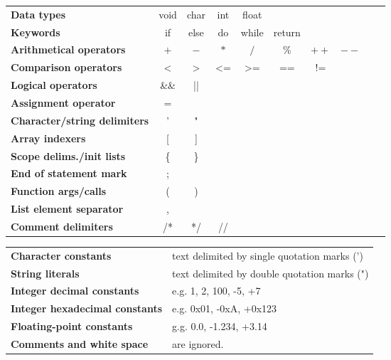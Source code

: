 \documentclass[12pt]{article}
\begin{document}
\begin{tabular}{lccccccccc}
\textbf{Data types}                      & void & char & int & float &         &      &      &   &   \\
\textbf{Keywords}                        & if   & else & do  & while & return  &      &      &   &   \\
\textbf{Arithmetical operators}          & $+$  & $-$  & $*$ & $/$   & $\%$    & $++$ & $--$ &   &   \\
\textbf{Comparison operators}            & <    & >    & <=  & >=    & ==      & !=   &      &   &   \\
\textbf{Logical operators}               & \&\& & ||   &     &       &         &      &      &   &   \\
\textbf{Assignment operator}             & =    &      &     &       &         &      &      &   &   \\
\textbf{Character/string delimiters}     & '    & "    &     &       &         &      &      &   &   \\
\textbf{Array indexers}                  & [    & ]    &     &       &         &      &      &   &   \\
\textbf{Scope delims./init lists}        & \{   & \}   &     &       &         &      &      &   &   \\
\textbf{End of statement mark}           & ;    &      &     &       &         &      &      &   &   \\
\textbf{Function args/calls}             & (    & )    &     &       &         &      &      &   &   \\
\textbf{List element separator}          & ,    &      &     &       &         &      &      &   &   \\
\textbf{Comment delimiters}              & /*   & */   & //  &       &         &      &      &   &   \\
\end{tabular}

\vspace*{1cm}

\begin{tabular}{ll}
\textbf{Character constants}            & text delimited by single quotation marks (') \\
\textbf{String literals}                & text delimited by double quotation marks (") \\
\textbf{Integer decimal constants}      & e.g. 1, 2, 100, -5, +7                       \\
\textbf{Integer hexadecimal constants}  & e.g. 0x01, -0xA, +0x123                      \\
\textbf{Floating-point constants}       & g.g. 0.0, -1.234, +3.14                      \\
\textbf{Comments and white space}        & are ignored.                                 \\
\end{tabular}
\end{document}
